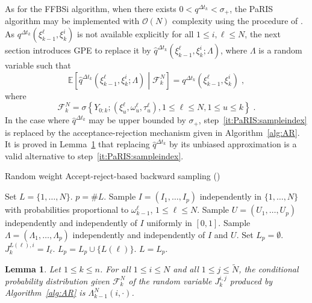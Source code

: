 \documentclass[12pt]{article}
\newcommand{\eqsp}{\;}
\newcommand{\1}{\mathrm{1}}
\newtheorem{lemma}{Lemma}
\begin{document}
As for the FFBSi algorithm,  when there exists $0<q^{\Delta t_k}<\sigma_+$, the PaRIS algorithm may be implemented with $\mathcal{O}(N)$ complexity using the procedure of \cite{douc:garivier:moulines:olsson:2011}.
As $q^{\Delta t_k}(\xi^{\ell}_{k-1},\xi_k^{i})$ is not available explicitly for all $1\le i,\ell\le N$, the next section introduces GPE to replace it by $\widehat{q}^{\Delta t_k}(\xi^{\ell}_{k-1},\xi_k^{i};\Lambda)$, where $\Lambda$ is a random variable such that
\[
\mathbb{E}\left[\widehat{q}^{\Delta t_k}(\xi^{\ell}_{k-1},\xi_k^{i};\Lambda)\middle| \mathcal{F}_k^N\right] = q^{\Delta t_k}(\xi^{\ell}_{k-1},\xi_k^{i})\eqsp,
\]
where 
\[
\mathcal{F}_k^N = \sigma\left\{Y_{0:k};(\xi^{\ell}_{u},\omega^{\ell}_{u},\tau^{\ell}_{u}), 1\le \ell\le N, 1\le u\le k\right\}\eqsp.
\]
In the case where $\widehat{q}^{\Delta t_k}$ may be upper bounded by $\sigma_+$, step~\eqref{it:PaRIS:sampleindex} is replaced by the acceptance-rejection mechanism given in Algorithm~\ref{alg:AR}. It is proved in Lemma~\ref{lem:AR:unbiased} that replacing $\widehat{q}^{\Delta t_k}$ by its unbiased approximation is a valid alternative to step~\eqref{it:PaRIS:sampleindex}.

\begin{algorithm}
\caption{Random weight Accept-reject-based backward sampling  (\cite{douc:garivier:moulines:olsson:2011})}
\begin{algorithmic}
\STATE Set $L =\{1,\ldots,N\}$. 
\STATE $p = \#L$.
\STATE Sample $I = (I_1,\ldots,I_p)$ independently in $\{1,\ldots,N\}$ with probabilities proportional to $\omega_{k-1}^{\ell}$, $1\le \ell\le N$.
\STATE Sample $U = (U_1,\ldots,U_p)$ independently and independently of $I$ uniformly in $[0,1]$.
\STATE Sample $\Lambda = (\Lambda_1,\ldots,\Lambda_p)$ independently and independently of $I$ and $U$.
\STATE Set $L_p = \emptyset$.
\STATE $J_k^{L(\ell),i} = I_\ell$.
\ELSE
\STATE $L_p = L_p \cup \{L(\ell)\}$.
\ENDIF
\ENDFOR
\STATE $L = L_p$.
\ENDWHILE
\ENDFOR
\end{algorithmic}
\label{alg:AR}
\end{algorithm}

\begin{lemma}
\label{lem:AR:unbiased}
Let $1\le k\le n$.  For all $1\le i \le N$ and all $1\le j \le \widetilde{N}$, the conditional probability distribution given $\mathcal{F}_k^N$ of the random variable $J_k^{i,j}$ produced by Algorithm~\ref{alg:AR} is  $\Lambda_{k-1}^N(i,\cdot)$. 
\end{lemma}
\end{document}
